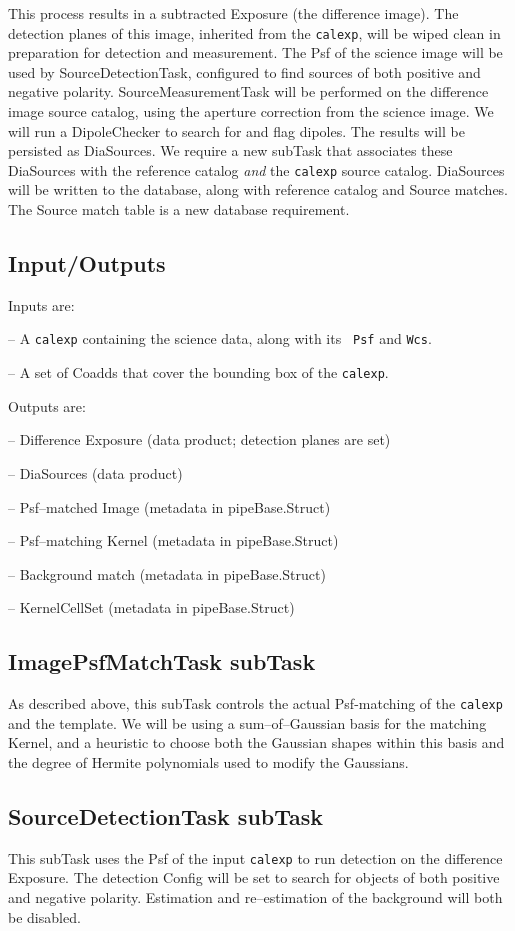 \documentclass[prd, nofootinbib, floatfix, 11pt,tightenlines,times]{article}
\begin{document}
This process results in a subtracted Exposure (the difference image).
The detection planes of this image, inherited from the {\tt calexp},
will be wiped clean in preparation for detection and measurement.  The
Psf of the science image will be used by SourceDetectionTask,
configured to find sources of both positive and negative polarity.
SourceMeasurementTask will be performed on the difference image source
catalog, using the aperture correction from the science image.  We
will run a DipoleChecker to search for and flag
dipoles.  The results will be persisted as DiaSources.  We require a
new subTask that associates these DiaSources with the reference
catalog {\it and} the {\tt calexp} source catalog.  DiaSources will be written to the database,
along with reference catalog and Source matches.  The Source match
table is a new database requirement.

\subsection{Input/Outputs}

Inputs are:

-- A {\tt calexp} containing the science data, along with its {\tt
  Psf} and {\tt Wcs}.

-- A set of Coadds that cover the bounding box of the {\tt calexp}.

Outputs are:

-- Difference Exposure (data product; detection planes are set)

-- DiaSources (data product)

-- Psf--matched Image (metadata in pipeBase.Struct)

-- Psf--matching Kernel (metadata in pipeBase.Struct)

-- Background match (metadata in pipeBase.Struct)

-- KernelCellSet (metadata in pipeBase.Struct)

\subsection{ImagePsfMatchTask subTask}
As described above, this subTask controls the actual Psf-matching of
the {\tt calexp} and the template.  We will be using a
sum--of--Gaussian basis for the matching Kernel, and a heuristic to
choose both the Gaussian shapes within this basis and the degree of
Hermite polynomials used to modify the Gaussians.

\subsection{SourceDetectionTask subTask}
This subTask uses the Psf of the input {\tt calexp} to run detection
on the difference Exposure.  The detection Config will be set to
search for objects of both positive and negative polarity.  Estimation
and re--estimation of the background will both be disabled.
\end{document}
